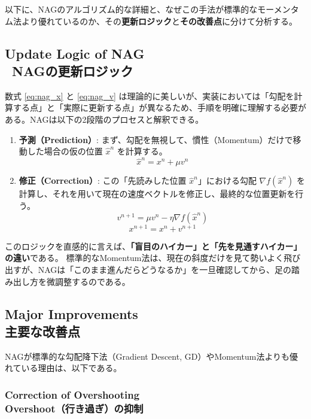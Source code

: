 \documentclass[dvipdfmx,a4paper,11pt]{jsarticle}
\begin{document}
以下に、NAGのアルゴリズム的な詳細と、なぜこの手法が標準的なモーメンタム法より優れているのか、その\textbf{更新ロジック}と\textbf{その改善点}に分けて分析する。

\subsection{Update Logic of NAG\\ \ NAGの更新ロジック}

数式 \eqref{eq:nag_x} と \eqref{eq:nag_v} は理論的に美しいが、実装においては「勾配を計算する点」と「実際に更新する点」が異なるため、手順を明確に理解する必要がある。NAGは以下の2段階のプロセスと解釈できる。

\begin{enumerate}[label=\textbf{Step \arabic*.}]
    \item \textbf{予測（Prediction）}: 
    まず、勾配を無視して、慣性（Momentum）だけで移動した場合の仮の位置 $\hat{x}^n$ を計算する。
    \[ \hat{x}^n = x^n + \mu v^n \]
    \item \textbf{修正（Correction）}: 
    この「先読みした位置 $\hat{x}^n$」における勾配 $\nabla f(\hat{x}^n)$ を計算し、それを用いて現在の速度ベクトルを修正し、最終的な位置更新を行う。
    \[ v^{n+1} = \mu v^n - \eta \nabla f(\hat{x}^n) \]
    \[ x^{n+1} = x^n + v^{n+1} \]
\end{enumerate}

このロジックを直感的に言えば、\textbf{「盲目のハイカー」と「先を見通すハイカー」の違い}である。
標準的なMomentum法は、現在の斜度だけを見て勢いよく飛び出すが、NAGは「このまま進んだらどうなるか」を一旦確認してから、足の踏み出し方を微調整するのである。

\subsection{Major Improvements\\ 主要な改善点}

NAGが標準的な勾配降下法（Gradient Descent, GD）やMomentum法よりも優れている理由は、以下である。

\subsubsection{Correction of Overshooting\\ Overshoot（行き過ぎ）の抑制}
\end{document}
